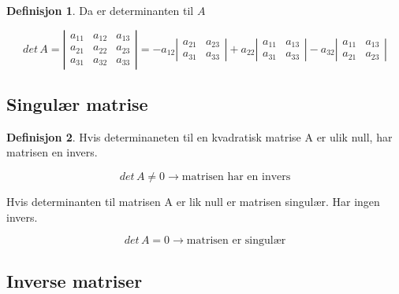 \documentclass[11pt]{article}
\theoremstyle{definition}
\newtheorem{mindef}{Definisjon}[section]
\newenvironment{fmindef}
{\begin{mdframed}[style=minstil]\begin{mindef}}
		{\end{mindef}\end{mdframed}}
\theoremstyle{definition}
\theoremstyle{definition}
\theoremstyle{definition}
\theoremstyle{definition}
\theoremstyle{definition}
\begin{document}
\begin{mindef}
		Da er determinanten til \(A\)
		
		\[det\,A=\left|\begin{array}{rrr} 
		a_{11} & a_{12} & a_{13} \\
		a_{21} & a_{22} & a_{23} \\
		a_{31} & a_{32} & a_{33}
		\end{array} \right|=-a_{12}\left|\begin{array}{rr} 
		a_{21} & a_{23}  \\
		a_{31} & a_{33} 
		\end{array} \right| + a_{22}\left|\begin{array}{rr} 
		a_{11} & a_{13} \\
		a_{31} & a_{33}
		\end{array} \right|-a_{32}\left|\begin{array}{rr} 
		a_{11} & a_{13} \\
		a_{21} & a_{23}
		\end{array} \right|
		\]
		\end{mindef}
		
		\newpage
		
		\subsection{Singulær matrise}
		
		\begin{fmindef}
			Hvis determinaneten til en kvadratisk matrise A er ulik null, har matrisen en invers.
			
			\[det\,A \neq 0 \rightarrow \text{matrisen har en invers} \]
			
			Hvis determinanten til matrisen A er lik null er matrisen singulær. Har ingen invers.
			
			\[det\,A = 0 \rightarrow \text{matrisen er singulær} \]
			
		\end{fmindef}
		
		\newpage
		
		\subsection{Inverse matriser}
		
\end{document}

